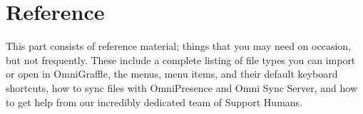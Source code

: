 \documentclass[../main.tex]{subfiles}
\begin{document}
\part{Reference}
This part consists of reference material; things that you may need on occasion, but not frequently.
These include a complete listing of file types you can import or open in OmniGraffle, the menus,
menu items, and their default keyboard shortcuts, how to sync files with OmniPresence and
Omni Sync Server, and how to get help from our incredibly dedicated team of Support Humans.





\end{document}
